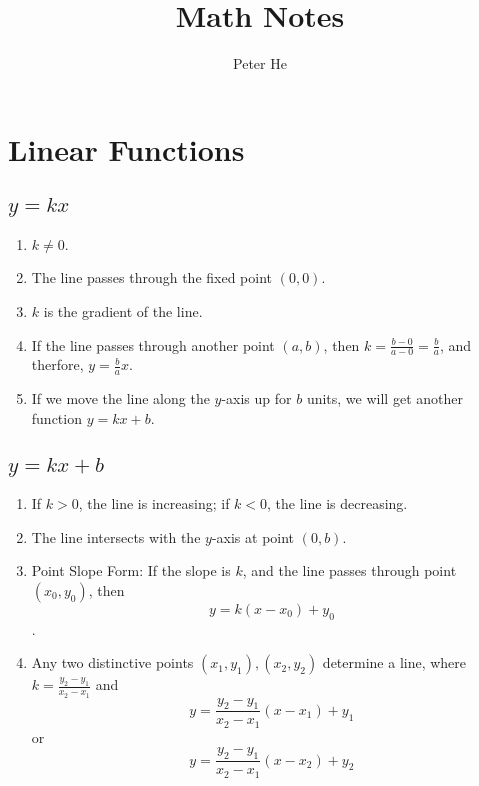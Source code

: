 \documentclass[11pt, oneside]{article}   	%
\title{Math Notes}
\author{Peter He}
\begin{document}
\maketitle




\section{Linear Functions}
\subsection{$y=kx$}
\begin{enumerate}

\item $k\ne0$.
\item The line passes through the fixed point $(0,0)$.
\item $k$ is the gradient of the line.
\item If the line passes through another point $(a,b)$, then $k=\frac{b-0}{a-0}=\frac{b}{a}$, and therfore, $y=\frac{b}{a} x$.
\item If we move the line along the $y$-axis up for $b$ units, we will get another function $y=kx+b$. 
\end{enumerate}

\begin{center}
\end{center}



\subsection{$y=kx+b$}
\begin{enumerate}


\item If $k>0$, the line is increasing; if $k<0$, the line is decreasing.
\item The line intersects with the $y$-axis at point $(0,b)$.
\item Point Slope Form: If the slope is $k$, and the line passes through point $(x_0,y_0)$, then \[y=k(x-x_0)+y_0\].
\item Any two distinctive points $(x_1,y_1), (x_2,y_2)$ determine a line, where $k=\frac{y_2-y_1}{x_2-x_1}$ and \[y=\frac{y_2-y_1}{x_2-x_1}(x-x_1)+y_1\] or  \[y=\frac{y_2-y_1}{x_2-x_1}(x-x_2)+y_2\]
\end{enumerate}
\end{document}
